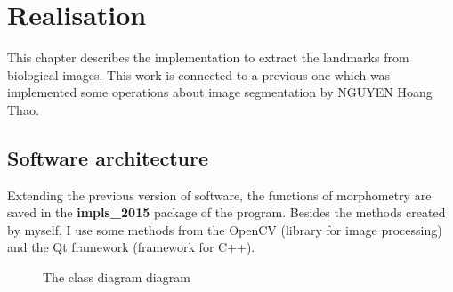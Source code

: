\chapter{Realisation}
This chapter describes the implementation to extract the landmarks from biological images. This work is connected to a previous one which was implemented some operations about image segmentation by NGUYEN Hoang Thao. 
\section{Software architecture}
Extending the previous version of software, the functions of morphometry are saved in the \textbf{impls\_2015} package of the program. Besides the methods created by myself, I use some methods from the OpenCV (library for image processing) and the Qt framework (framework for C++).\\[0.2cm]
\begin{figure}[p]
    \vspace*{-3cm}
    \caption{The class diagram diagram}
    \label{fig:cdiagram}
\end{figure}
